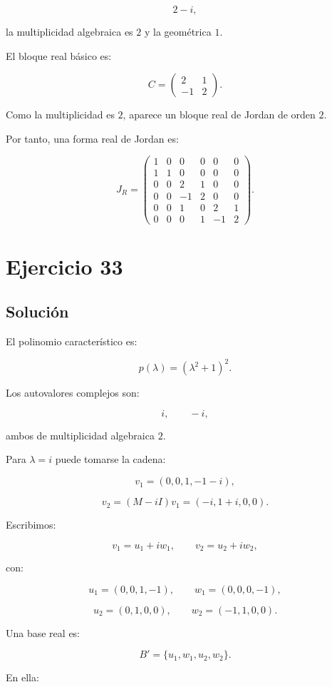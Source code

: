 \documentclass[11pt,a4paper]{article}
\begin{document}
\[
2-i,
\]

la multiplicidad algebraica es $2$ y la geométrica $1$.

El bloque real básico es:

\[
C=
\begin{pmatrix}
2&1\\
-1&2
\end{pmatrix}.
\]

Como la multiplicidad es $2$, aparece un bloque real de Jordan de orden $2$.

Por tanto, una forma real de Jordan es:

\[
\boxed{
J_R=
\begin{pmatrix}
1&0&0&0&0&0\\
1&1&0&0&0&0\\
0&0&2&1&0&0\\
0&0&-1&2&0&0\\
0&0&1&0&2&1\\
0&0&0&1&-1&2
\end{pmatrix}.
}
\]

\section{Ejercicio 33}
\subsection{Solución}

El polinomio característico es:

\[
p(\lambda)
=
(\lambda^2+1)^2.
\]

Los autovalores complejos son:

\[
i,\qquad-i,
\]

ambos de multiplicidad algebraica $2$.

Para $\lambda=i$ puede tomarse la cadena:

\[
v_1=(0,0,1,-1-i),
\]

\[
v_2=(M-iI)v_1=(-i,1+i,0,0).
\]

Escribimos:

\[
v_1=u_1+iw_1,
\qquad
v_2=u_2+iw_2,
\]

con:

\[
u_1=(0,0,1,-1),
\qquad
w_1=(0,0,0,-1),
\]

\[
u_2=(0,1,0,0),
\qquad
w_2=(-1,1,0,0).
\]

Una base real es:

\[
\boxed{
B'=
\{u_1,w_1,u_2,w_2\}.
}
\]

En ella:
\end{document}
